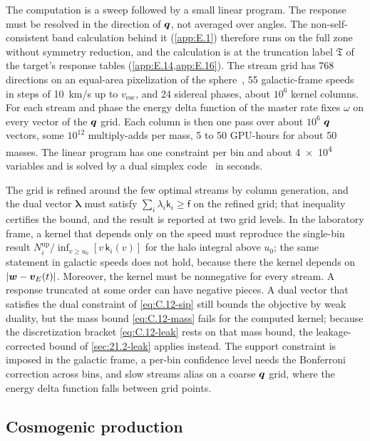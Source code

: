 The computation is a sweep followed by a small linear program. The response must be resolved in the direction of $\bm{q}$, not averaged over angles. The non-self-consistent band calculation behind it (\cref{app:E.1}) therefore runs on the full zone without symmetry reduction, and the calculation is at the truncation label $\mathfrak{T}$ of the target's response tables (\cref{app:E.14,app:E.16}). The stream grid has 768 directions on an equal-area pixelization of the sphere~\cite{gorski2005healpix}, 55 galactic-frame speeds in steps of \SI{10}{km/s} up to $v_{\mathrm{esc}}$, and 24 sidereal phases, about $10^6$ kernel columns. For each stream and phase the energy delta function of the master rate fixes $\omega$ on every vector of the $\bm{q}$ grid. Each column is then one pass over about $10^6$ $\bm{q}$ vectors, some $10^{12}$ multiply-adds per mass, 5 to 50 GPU-hours for about 50 masses. The linear program has one constraint per bin and about \num{4e4} variables and is solved by a dual simplex code~\cite{huangfu2018parallelizing} in seconds.

The grid is refined around the few optimal streams by column generation, and the dual vector $\boldsymbol{\lambda}$ must satisfy $\sum_i\lambda_i\mathsf{k}_i \ge \mathsf{f}$ on the refined grid; that inequality certifies the bound, and the result is reported at two grid levels. In the laboratory frame, a kernel that depends only on the speed must reproduce the single-bin result $N_i^{\mathrm{up}}/\inf_{v \ge u_0}[v\,\mathsf{k}_i(v)]$ for the halo integral above $u_0$; the same statement in galactic speeds does not hold, because there the kernel depends on $|\bm{w} - \bm{v}_E(t)|$. Moreover, the kernel must be nonnegative for every stream. A response truncated at some order can have negative pieces. A dual vector that satisfies the dual constraint of \cref{eq:C.12-sip} still bounds the objective by weak duality, but the mass bound \cref{eq:C.12-mass} fails for the computed kernel; because the discretization bracket \cref{eq:C.12-leak} rests on that mass bound, the leakage-corrected bound of \cref{sec:21.2-leak} applies instead. The support constraint is imposed in the galactic frame, a per-bin confidence level needs the Bonferroni correction across bins, and slow streams alias on a coarse $\bm{q}$ grid, where the energy delta function falls between grid points.

\subsection{Cosmogenic production}


